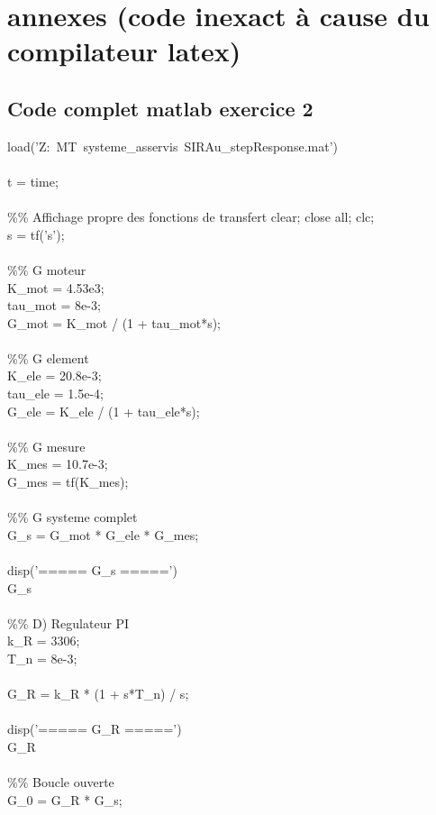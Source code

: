 \documentclass[letterpaper,12pt]{article}
\begin{document}
\newpage
\section{annexes (code inexact à cause du compilateur latex)}
\subsection{Code complet matlab exercice 2}
load('Z:\ MT\ systeme\_asservis\ SIRAu\_stepResponse.mat')
\\
\\t = time;
\\\\
\%\% Affichage propre des fonctions de transfert
    clear; close all; clc;
\\
s = tf('s');
\\
\\\%\% G moteur
\\K\_mot = 4.53e3;
\\tau\_mot = 8e-3;
\\G\_mot = K\_mot / (1 + tau\_mot*s);
\\
\\\%\% G element
\\K\_ele = 20.8e-3;
\\tau\_ele = 1.5e-4;
\\G\_ele = K\_ele / (1 + tau\_ele*s);
\\
\\\%\% G mesure
\\K\_mes = 10.7e-3;
\\G\_mes = tf(K\_mes);
\\
\\\%\% G systeme complet
\\G\_s = G\_mot * G\_ele * G\_mes;
\\
\\disp('===== G\_s =====')
\\G\_s
\\
\\\%\% D) Regulateur PI
\\k\_R = 3306;
\\T\_n = 8e-3;
\\
\\G\_R = k\_R * (1 + s*T\_n) / s;
\\
\\disp('===== G\_R =====')
\\G\_R
\\
\\\%\% Boucle ouverte
\\G\_0 = G\_R * G\_s;
\end{document}
